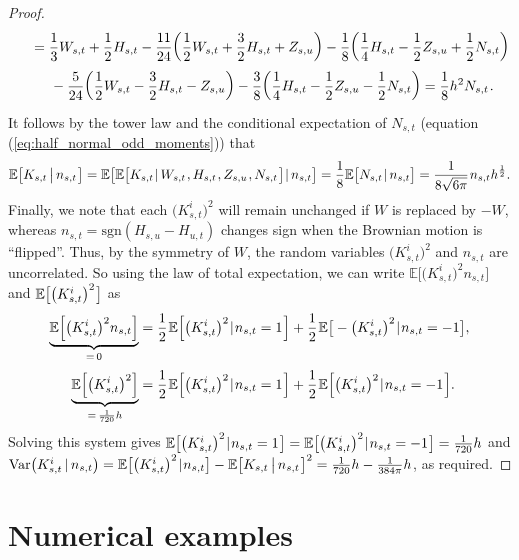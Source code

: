\documentclass[sn-mathphys-num]{sn-jnl}%
\newcommand{\E}{\mathbb{E}}
\newcommand{\m}{\hspace{0.25mm}}
\newcommand{\mm}{\hspace{5mm}}
\newcommand{\mmm}{\hspace{10mm}}
\newcommand{\var}{\mathrm{Var}}
\newcommand{\sgn}{\mathrm{sgn}}
\begin{document}
\begin{proof}
\begin{align*}
&\mm = \frac{1}{3} W_{s,t}+ \frac{1}{2} H_{s,t} - \frac{11}{24} \bigg(\frac{1}{2}W_{s,t} + \frac{3}{2}H_{s,t} + Z_{s,u}\bigg) - \frac{1}{8}\bigg(\frac{1}{4}H_{s,t} - \frac{1}{2}Z_{s,u} + \frac{1}{2}N_{s,t}\bigg)\\
&\mmm  - \frac{5}{24}\bigg(\frac{1}{2}W_{s,t} - \frac{3}{2}H_{s,t} - Z_{s,u}\bigg) - \frac{3}{8}\bigg(\frac{1}{4}H_{s,t} - \frac{1}{2}Z_{s,u} - \frac{1}{2}N_{s,t}\bigg) = \frac{1}{8}h^2 N_{s,t}\m.
\end{align*}
It follows by the tower law and the conditional expectation of $N_{s,t}$ (equation (\ref{eq:half_normal_odd_moments})) that
\begin{align*}
\E\big[K_{s,t}\,\big|\, n_{s,t}\m\big] =  \E\big[\E\big[K_{s,t}\m|\, W_{s,t}\m, H_{s,t}\m, Z_{s,u}\m, N_{s,t}\m\big]\m|\, n_{s,t}\big] = \frac{1}{8}\E\big[N_{s,t}\m |\,n_{s,t}\big] = \frac{1}{8\sqrt{6\pi}}\m n_{s,t} h^{\frac{1}{2}}.
\end{align*}
Finally, we note that each $\big(K_{s,t}^i\big)^2$ will remain unchanged if $W$ is replaced by $-W$,\vspace{0.5mm} whereas $n_{s,t} = \sgn(H_{s,u} - H_{u,t})$ changes sign when the Brownian motion is ``flipped''.
Thus, by the symmetry of $W$, the random variables $\big(K_{s,t}^i\big)^2$ and $n_{s,t}$ are uncorrelated.
So using the law of total expectation, we can write $\E\big[\big(K_{s,t}^i\big)^2 n_{s,t}\big]$ and $\E\big[\big(K_{s,t}^i\big)^2\m\big]$ as
\begin{align*}
\underbrace{\E\Big[\big(K_{s,t}^i\big)^2 n_{s,t}\Big]}_{=\,0} & = \frac{1}{2}\m\E\Big[\big(K_{s,t}^i\big)^2\m|\m n_{s,t} = 1\m\Big] + \frac{1}{2}\m\E\big[-\big(K_{s,t}^i\big)^2\m|\m n_{s,t} = -1\big],\\[3pt]
\underbrace{\E\Big[\big(K_{s,t}^i\big)^2\Big]}_{=\,\frac{1}{720} h} & = \frac{1}{2}\m\E\Big[\big(K_{s,t}^i\big)^2\m|\m n_{s,t} = 1\m\Big] + \frac{1}{2}\m\E\Big[\big(K_{s,t}^i\big)^2\m|\m n_{s,t} = -1\m\Big].
\end{align*}
Solving this system gives $\E\big[\big(K_{s,t}^i\big)^2\m|\m n_{s,t} = 1\m\big] = \E\big[\big(K_{s,t}^i\big)^2\m|\m n_{s,t} = -1\m\big] = \frac{1}{720} h$ and  $\var\big(K_{s,t}^i \,|\, n_{s,t}\big) = \E\big[\big(K_{s,t}^i\big)^2\m|\m n_{s,t}\big] - \E\big[K_{s,t}\,\big|\, n_{s,t}\m\big]^2 = \frac{1}{720}h - \frac{1}{384\pi}h$, as required.
\end{proof}

\section{Numerical examples}\label{sect:examples}
\end{document}
